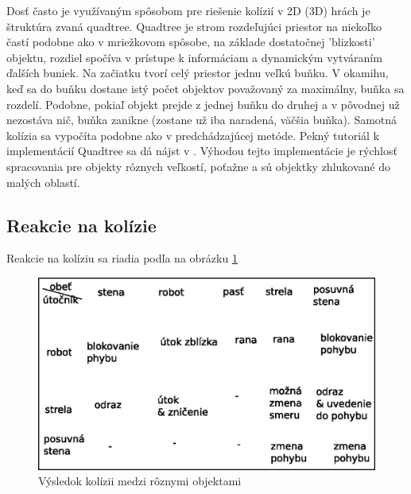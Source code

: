 \indent Dosť často je využívaným spôsobom pre riešenie kolízií v 2D (3D) hrách je štruktúra zvaná quadtree. Quadtree je strom rozdeľujúci priestor na niekoľko častí podobne ako v mriežkovom spôsobe, na základe dostatočnej 'blizkosti' objektu, rozdiel spočíva v prístupe k informáciam a dynamickým vytváraním ďalších buniek. Na začiatku tvorí celý priestor jednu veľkú buňku. V okamihu, keď sa do buňku dostane istý počet objektov považovaný za maximálny, buňka sa rozdelí. Podobne, pokiaľ objekt prejde z jednej buňku do druhej a v pôvodnej už nezostáva nič, buňka zanikne (zostane už iba naradená, väčšia buňka). Samotná kolízia sa vypočíta podobne ako v predchádzajúcej metóde. Pekný tutoriál k implementácií Quadtree sa dá  nájst v \cite{quadtree}. Výhodou tejto implementácie je rýchlosť spracovania pre objekty rôznych veľkostí, poťažne a sú objektky zhlukované do malých oblastí.
\subsection{Reakcie na kolízie}
Reakcie na kolíziu sa riadia podľa na obrázku \ref{fig:kol}
\begin {figure}
\centering
\includegraphics{kolizie}
{ Výsledok kolízii medzi rôznymi objektami }
\label{fig:kol}
\end {figure}

